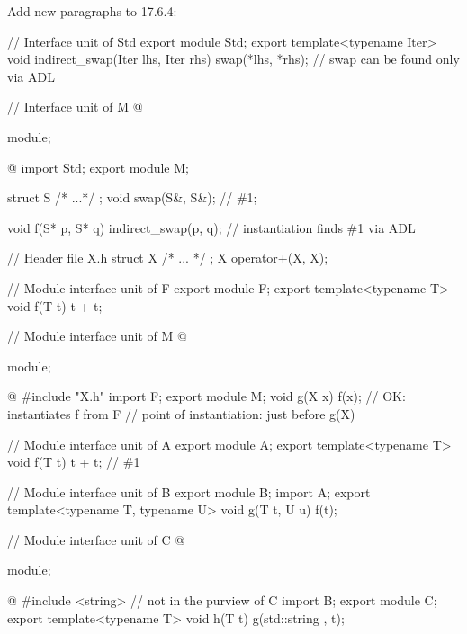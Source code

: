 \noindent
Add new paragraphs to 17.6.4:
\begin{std.txt}
   \color{addclr}
   \resetalinea[1]
   \alinea
   \enterexample
   \begin{codeblock}
     // Interface unit of Std
     export module Std;
     export template<typename Iter>
     void indirect_swap(Iter lhs, Iter rhs)
     {
        swap(*lhs, *rhs);    // swap can be found only via ADL
     }

     // Interface unit of M
     @\begin{after}\color{addclr}
     module;
     \end{after}@
     import Std;
     export module M;

     struct S { /* ...*/ };
     void swap(S&, S&);     // \#1;

     void f(S* p, S* q)
     {
        indirect_swap(p, q);   // instantiation finds \#1 via ADL
     }
   \end{codeblock}
   \exitexample
     
   \alinea
   \enterexample
   \begin{codeblock}
      // Header file X.h
      struct X { /* ... */ };
      X operator+(X, X);

      // Module interface unit of F
      export module F;
      export template<typename T>
      void f(T t) {
          t + t;
      }

      // Module interface unit of M
      @\begin{after}\color{addclr}
      module;
      \end{after}@
      #include "X.h"
      import F;
      export module M;
      void g(X x) {
         f(x);          // OK: instantiates f from F
                        // point of instantiation: just before g(X)
      }
   \end{codeblock}
   \exitexample

   \alinea
   \enternote
   \enterexample
   \begin{codeblock}
      // Module interface unit of A
      export module A;
      export template<typename T>
      void f(T t) {
         t + t;         // \#1
      }

      // Module interface unit of B
      export module B;
      import A;
      export template<typename T, typename U>
      void g(T t, U u) {
         f(t);
      }

      // Module interface unit of C
      @\begin{after}\color{addclr}
      module;
      \end{after}@
      #include <string>        // not in the purview of C
      import B;
      export module C;
      export template<typename T>
      void h(T t) {
         g(std::string{ }, t);
      }


\end{codeblock}
\end{std.txt}
